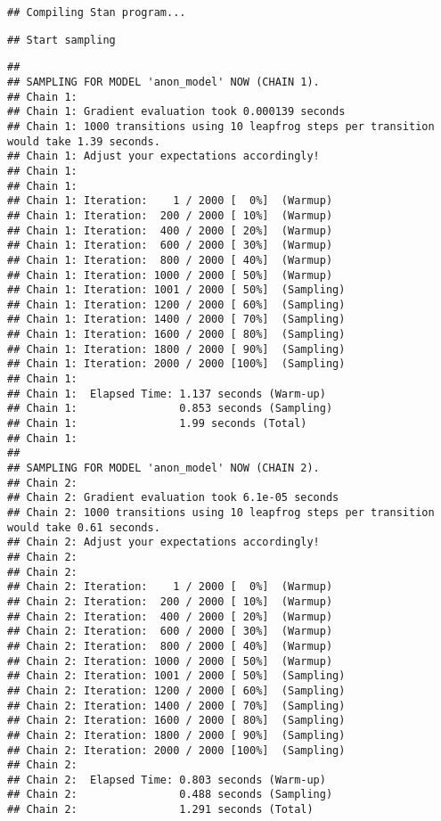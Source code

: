 \documentclass[
]{article}
\begin{document}
\begin{verbatim}
## Compiling Stan program...
\end{verbatim}

\begin{verbatim}
## Start sampling
\end{verbatim}

\begin{verbatim}
## 
## SAMPLING FOR MODEL 'anon_model' NOW (CHAIN 1).
## Chain 1: 
## Chain 1: Gradient evaluation took 0.000139 seconds
## Chain 1: 1000 transitions using 10 leapfrog steps per transition would take 1.39 seconds.
## Chain 1: Adjust your expectations accordingly!
## Chain 1: 
## Chain 1: 
## Chain 1: Iteration:    1 / 2000 [  0%]  (Warmup)
## Chain 1: Iteration:  200 / 2000 [ 10%]  (Warmup)
## Chain 1: Iteration:  400 / 2000 [ 20%]  (Warmup)
## Chain 1: Iteration:  600 / 2000 [ 30%]  (Warmup)
## Chain 1: Iteration:  800 / 2000 [ 40%]  (Warmup)
## Chain 1: Iteration: 1000 / 2000 [ 50%]  (Warmup)
## Chain 1: Iteration: 1001 / 2000 [ 50%]  (Sampling)
## Chain 1: Iteration: 1200 / 2000 [ 60%]  (Sampling)
## Chain 1: Iteration: 1400 / 2000 [ 70%]  (Sampling)
## Chain 1: Iteration: 1600 / 2000 [ 80%]  (Sampling)
## Chain 1: Iteration: 1800 / 2000 [ 90%]  (Sampling)
## Chain 1: Iteration: 2000 / 2000 [100%]  (Sampling)
## Chain 1: 
## Chain 1:  Elapsed Time: 1.137 seconds (Warm-up)
## Chain 1:                0.853 seconds (Sampling)
## Chain 1:                1.99 seconds (Total)
## Chain 1: 
## 
## SAMPLING FOR MODEL 'anon_model' NOW (CHAIN 2).
## Chain 2: 
## Chain 2: Gradient evaluation took 6.1e-05 seconds
## Chain 2: 1000 transitions using 10 leapfrog steps per transition would take 0.61 seconds.
## Chain 2: Adjust your expectations accordingly!
## Chain 2: 
## Chain 2: 
## Chain 2: Iteration:    1 / 2000 [  0%]  (Warmup)
## Chain 2: Iteration:  200 / 2000 [ 10%]  (Warmup)
## Chain 2: Iteration:  400 / 2000 [ 20%]  (Warmup)
## Chain 2: Iteration:  600 / 2000 [ 30%]  (Warmup)
## Chain 2: Iteration:  800 / 2000 [ 40%]  (Warmup)
## Chain 2: Iteration: 1000 / 2000 [ 50%]  (Warmup)
## Chain 2: Iteration: 1001 / 2000 [ 50%]  (Sampling)
## Chain 2: Iteration: 1200 / 2000 [ 60%]  (Sampling)
## Chain 2: Iteration: 1400 / 2000 [ 70%]  (Sampling)
## Chain 2: Iteration: 1600 / 2000 [ 80%]  (Sampling)
## Chain 2: Iteration: 1800 / 2000 [ 90%]  (Sampling)
## Chain 2: Iteration: 2000 / 2000 [100%]  (Sampling)
## Chain 2: 
## Chain 2:  Elapsed Time: 0.803 seconds (Warm-up)
## Chain 2:                0.488 seconds (Sampling)
## Chain 2:                1.291 seconds (Total)

\end{verbatim}
\end{document}
